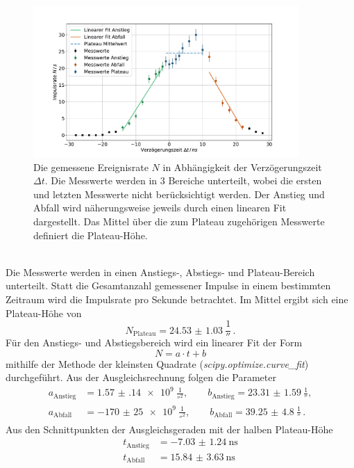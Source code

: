 \begin{figure}
    \centering
    \includegraphics[width=0.9\textwidth]{content/plots/verzoegerungszeit.pdf}
    \caption{Die gemessene Ereignisrate $N$ in Abhängigkeit der Verzögerungszeit $\Delta t$.
    Die Messwerte werden in 3 Bereiche unterteilt, wobei die ersten und letzten Messwerte nicht berücksichtigt werden.
    Der Anstieg und Abfall wird näherungsweise jeweils durch einen linearen Fit dargestellt.
    Das Mittel über die zum Plateau zugehörigen Messwerte definiert die Plateau-Höhe.}
    \label{fig:verzoegerung}
\end{figure}
\\
Die Messwerte werden in einen Anstiegs-, Abstiegs- und Plateau-Bereich unterteilt.
Statt die Gesamtanzahl gemessener Impulse in einem bestimmten Zeitraum wird die Impulsrate pro Sekunde betrachtet.
Im Mittel ergibt sich eine Plateau-Höhe von
\begin{equation}
    N_\text{Plateau} = \qty{24.53(103)}{\frac{1}{\second}} \,.
\end{equation}
Für den Anstiegs- und Abstiegsbereich wird ein linearer Fit der Form
\begin{equation*}
    N = a \cdot t + b
\end{equation*}
mithilfe der Methode der kleinsten Quadrate (\textit{scipy.optimize.curve\_fit}\cite{scipy}) durchgeführt.
Aus der Ausgleichsrechnung folgen die Parameter
\begin{align*}
    a_\text{Anstieg} &= \qty{1.57(14)e9}{\frac{1}{\second^2}},\qquad b_\text{Anstieg} = \qty{23.31(159)}{\frac{1}{\second}}, \\
    a_\text{Abfall} &= \qty{-170(25)e9}{\frac{1}{\second^2}},\qquad b_\text{Abfall} = \qty{39.25(480)}{\frac{1}{\second}} \,.
\end{align*}
Aus den Schnittpunkten der Ausgleichsgeraden mit der halben Plateau-Höhe
\begin{align*}
    t_\text{Anstieg} &= \qty{-7.03(124)}{\nano\second} \\
    t_\text{Abfall} &= \qty{15.84(363)}{\nano\second}
\end{align*}
